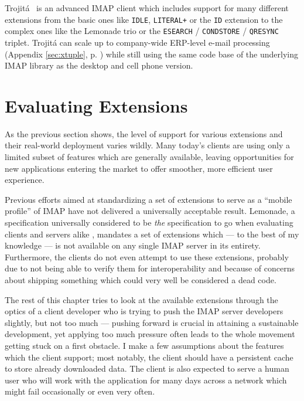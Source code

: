 \documentclass[trojita]{subfiles}
\begin{document}
Trojitá~\cite{trojita-website} is an advanced IMAP client which includes support for many different extensions from the
basic ones like {\tt IDLE}, {\tt LITERAL+} or the {\tt ID} extension to the complex ones like the Lemonade trio or the
{\tt ESEARCH} / {\tt CONDSTORE} / {\tt QRESYNC} triplet.  Trojitá can scale up to company-wide ERP-level e-mail
processing (Appendix \ref{sec:xtuple}, p. \pageref{sec:xtuple}) while still using the same code base of
the underlying IMAP library as the desktop and cell phone version.

\section{Evaluating Extensions}

As the previous section shows, the level of support for various extensions and their real-world deployment varies
wildly.  Many today's clients are using only a limited subset of features which are generally available, leaving
opportunities for new applications entering the market to offer smoother, more efficient user experience.

Previous efforts aimed at standardizing a set of extensions to serve as a ``mobile profile'' of IMAP have not delivered
a universally acceptable result.  Lemonade, a specification universally considered to be {\em the} specification to go
when evaluating clients and servers alike \cite{isode-lemonade}, mandates a set of extensions which --- to the best of
my knowledge --- is not available on any single IMAP server in its entirety.  Furthermore, the clients do not even
attempt to use these extensions, probably due to not being able to verify them for interoperability and because of
concerns about shipping something which could very well be considered a dead code.

The rest of this chapter tries to look at the available extensions through the optics of a client developer who is
trying to push the IMAP server developers slightly, but not too much --- pushing forward is crucial in attaining a
sustainable development, yet applying too much pressure often leads to the whole movement getting stuck on a first
obstacle.  I make a few assumptions about the features which the client support; most notably, the client should have a
persistent cache to store already downloaded data.  The client is also expected to serve a human user who will work with
the application for many days across a network which might fail occasionally or even very often.
\end{document}
